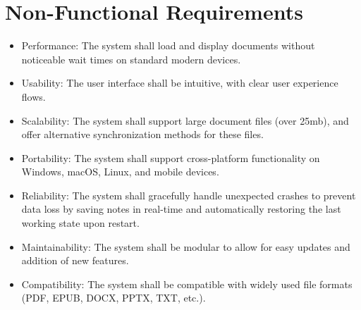 \section{Non-Functional Requirements}
\begin{itemize}
    \item Performance: The system shall load and display documents without noticeable wait times on standard modern devices.

    \item Usability: The user interface shall be intuitive, with clear user experience flows. 

    \item Scalability: The system shall support large document files (over 25mb), and offer alternative synchronization methods for these files. 

    \item Portability: The system shall support cross-platform functionality on Windows, macOS, Linux, and mobile devices.

    \item Reliability: The system shall gracefully handle unexpected crashes to prevent data loss by saving notes in real-time and automatically restoring the last working state upon restart.

    \item Maintainability: The system shall be modular to allow for easy updates and addition of new features.

    \item Compatibility: The system shall be compatible with widely used file formats (PDF, EPUB, DOCX, PPTX, TXT, etc.).
\end{itemize}


